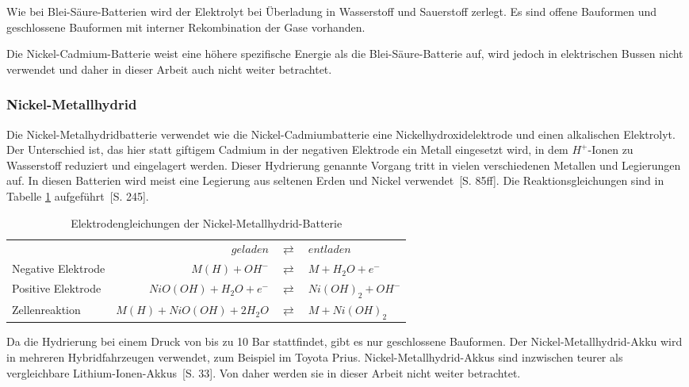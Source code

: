 Wie bei Blei-Säure-Batterien wird der Elektrolyt bei Überladung in Wasserstoff und Sauerstoff zerlegt. Es sind offene Bauformen und geschlossene Bauformen mit interner Rekombination der Gase vorhanden.

Die Nickel-Cadmium-Batterie weist eine höhere spezifische Energie als die Blei-Säure-Batterie auf, wird jedoch in elektrischen Bussen nicht verwendet und daher in dieser Arbeit auch nicht weiter betrachtet.

\subsubsection{Nickel-Metallhydrid}
Die Nickel-Metalhydridbatterie verwendet wie die Nickel-Cadmiumbatterie eine Nickelhydroxidelektrode und einen alkalischen Elektrolyt. Der Unterschied ist, das hier statt giftigem Cadmium in der negativen Elektrode ein Metall eingesetzt wird, in dem $H^+$-Ionen zu Wasserstoff reduziert und eingelagert werden. Dieser Hydrierung genannte Vorgang tritt in vielen verschiedenen Metallen und Legierungen auf. In diesen Batterien wird meist eine Legierung aus seltenen Erden und Nickel verwendet~\cite{KiehneBattery}[S. 85ff]. Die Reaktionsgleichungen sind in Tabelle \ref{NiMH} aufgeführt~\cite{Sterner:2014}[S. 245].

\begin{table}\centering
	\begin{tabularx}{\linewidth}{XrcX}
		\toprule
		&              $geladen$ & $\rightleftarrows$ & $entladen$        \\
		Negative Elektrode &          $M(H) + OH^-$ & $\rightleftarrows$ & $M + H_2O + e^-$  \\
		Positive Elektrode &   $NiO(OH) + H_2O + e^-$ & $\rightleftarrows$ & $Ni(OH)_2 + OH^-$ \\ \midrule
		Zellenreaktion     & $M(H) + NiO(OH) + 2H_2O$ & $\rightleftarrows$ & $M + Ni(OH)_2$    \\ \bottomrule
	\end{tabularx}
	\caption{Elektrodengleichungen der Nickel-Metallhydrid-Batterie}
	\label{NiMH}
\end{table}

Da die Hydrierung bei einem Druck von bis zu 10 Bar stattfindet, gibt es nur geschlossene Bauformen. Der Nickel-Metallhydrid-Akku wird in mehreren Hybridfahrzeugen verwendet, zum Beispiel im Toyota Prius. Nickel-Metallhydrid-Akkus sind inzwischen teurer als vergleichbare Lithium-Ionen-Akkus~\cite{Schimke:2012}[S. 33]. Von daher werden sie in dieser Arbeit nicht weiter betrachtet.

